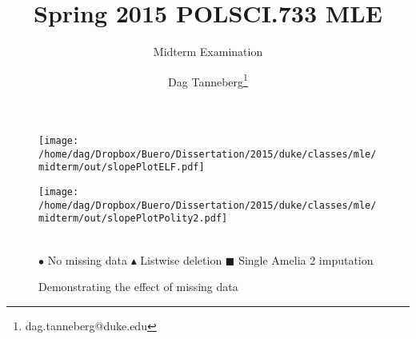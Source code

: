 \documentclass[draft=true,parskip=half]{scrartcl}\usepackage[]{graphicx}\usepackage[]{color}
\title{Spring 2015 POLSCI.733 MLE}
\subtitle{Midterm Examination}
\author{Dag Tanneberg\thanks{dag.tanneberg@duke.edu}}
\begin{document}
\maketitle

 \begin{figure}[!htb]
     \centering
     \caption{Demonstrating the effect of missing data}
     \begin{minipage}{.49\textwidth}
         \centering
         \texttt{[image: /home/dag/Dropbox/Buero/Dissertation/2015/duke/classes/mle/midterm/out/slopePlotELF.pdf]}
     \end{minipage}%
     \hfill
     \begin{minipage}{.49\textwidth}
         \centering
         \texttt{[image: /home/dag/Dropbox/Buero/Dissertation/2015/duke/classes/mle/midterm/out/slopePlotPolity2.pdf]}
     \end{minipage}\\
\footnotesize{%
 $\bullet$ No missing data $\blacktriangle$ Listwise deletion
 $\blacksquare$ Single Amelia 2 imputation%
}
\end{figure}
\end{document}
